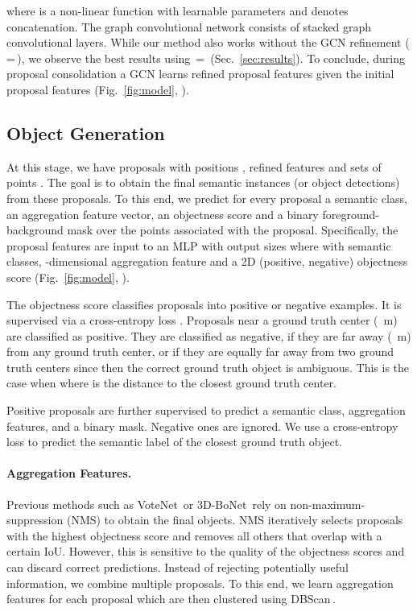 \documentclass[10pt,twocolumn,letterpaper]{article}
\newcommand{\refsec}[1]{Sec.~\ref{sec:#1}}
\newcommand{\reffig}[1]{Fig.~\ref{fig:#1}}
\newcommand{\colorsquare}[1]{{\color{#1}}\hspace{-7.78pt}}
\newcommand{\parag}[1]{\vspace{0px}\paragraph{#1}\hspace{-9pt}}
\begin{document}
where  is a non-linear function with learnable parameters  and  denotes concatenation. The graph convolutional network consists of  stacked graph convolutional layers.
While our method also works without the GCN refinement (\ie \,=\,), we observe the best results using \,=\, (\refsec{results}).
To conclude, during proposal consolidation a GCN learns refined proposal features  given the initial proposal features  (\reffig{model}, \colorsquare{m_red}).

\subsection{Object Generation}
\label{sec:object_generation}
\vspace{-5px}
At this stage, we have  proposals  with positions , refined features  and sets of points .
The goal is to obtain the final semantic instances (or object detections) from these proposals.
To this end, we predict for every proposal a semantic class, an aggregation feature vector, an objectness score and a binary foreground-background mask over the points  associated with the proposal.
Specifically, the proposal features  are input to an MLP with output sizes 
where  with  semantic classes,
-dimensional aggregation feature and a 2D (positive, negative) objectness score (\reffig{model}, \colorsquare{m_violet}).

The objectness score \cite{Qi19ICCV,Shaoqing15NIPS} classifies proposals into positive or negative examples.
It is supervised via a cross-entropy loss .
Proposals near a ground truth center (~m) are classified as positive.
They are classified as negative, if they are far away (~m) from any ground truth center,
or if they are equally far away from two ground truth centers since then the correct ground truth object is ambiguous.
This is the case when  where  is the distance to the  closest ground truth center.

Positive proposals are further supervised to predict a semantic class, aggregation features, and a binary mask.
Negative ones are ignored.
We use a cross-entropy loss  to predict the semantic label of the closest ground truth object.

\vspace{-13px}
\parag{Aggregation Features.}
Previous methods such as VoteNet\,\cite{Qi19ICCV} or 3D-BoNet\,\cite{Yang19CVPR} rely on non-maximum-suppression (NMS) to obtain the final objects.
NMS iteratively selects proposals with the highest objectness score and removes all others that overlap with a certain IoU.
However, this is sensitive to the quality of the objectness scores and can discard correct predictions.
Instead of rejecting potentially useful information, we combine multiple proposals.
To this end, we learn aggregation features for each proposal which are then clustered using DBScan\,\cite{Ester96KDD}.
\end{document}
